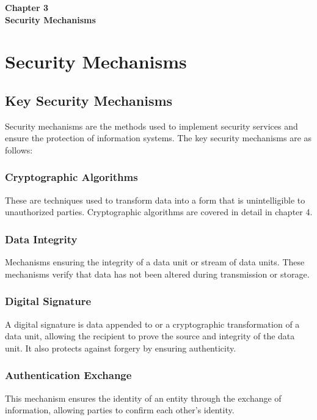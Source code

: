 \thispagestyle{empty}

\begin{center}
    \vspace*{\fill}
    \Huge \textbf{Chapter 3} \\
    \Huge \textbf{Security Mechanisms}
    \vspace*{\fill}
\end{center}

\newpage
\chapter{Security Mechanisms}

\section{Key Security Mechanisms}
Security mechanisms are the methods used to implement security services and ensure the protection of information systems. The key security mechanisms are as follows:

\subsection{Cryptographic Algorithms}
These are techniques used to transform data into a form that is unintelligible to unauthorized parties. Cryptographic algorithms are covered in detail in chapter 4.

\subsection{Data Integrity}
Mechanisms ensuring the integrity of a data unit or stream of data units. These mechanisms verify that data has not been altered during transmission or storage.

\subsection{Digital Signature}
A digital signature is data appended to or a cryptographic transformation of a data unit, allowing the recipient to prove the source and integrity of the data unit. It also protects against forgery by ensuring authenticity.

\subsection{Authentication Exchange}
This mechanism ensures the identity of an entity through the exchange of information, allowing parties to confirm each other’s identity.

